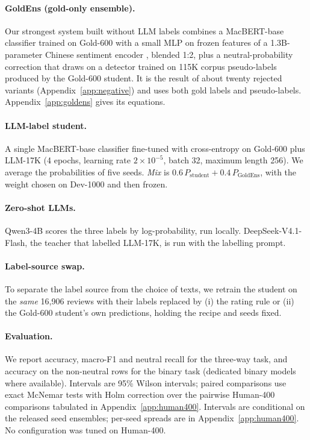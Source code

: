 \paragraph{GoldEns (gold-only ensemble).} Our strongest system built
without LLM labels combines a MacBERT-base classifier
\citep{cui2020macbert} trained on Gold-600 with a small MLP on frozen
features of a 1.3B-parameter Chinese sentiment encoder
\citep{fengshenbang2022}, blended 1:2, plus a neutral-probability
correction that draws on a detector trained on 115K corpus
pseudo-labels produced by the Gold-600 student. It is the result of
about twenty rejected variants (Appendix~\ref{app:negative}) and uses
both gold labels and pseudo-labels. Appendix~\ref{app:goldens} gives
its equations.

\paragraph{LLM-label student.} A single MacBERT-base classifier
fine-tuned with cross-entropy on Gold-600 plus LLM-17K (4 epochs,
learning rate $2{\times}10^{-5}$, batch 32, maximum length 256). We
average the probabilities of five seeds. \emph{Mix} is
$0.6\,P_{\text{student}} + 0.4\,P_{\text{GoldEns}}$, with the weight
chosen on Dev-1000 and then frozen.

\paragraph{Zero-shot LLMs.} Qwen3-4B \citep{qwen2025} scores the three
labels by log-probability, run locally.
\ifSone DeepSeek-V4.1-Flash, the teacher that labelled LLM-17K, is
run with the labelling prompt.\fi

\ifStwo
\paragraph{Label-source swap.} To separate the label source from the
choice of texts, we retrain the student on the \emph{same} 16{,}906
reviews with their labels replaced by (i) the rating rule or (ii) the
Gold-600 student's own predictions, holding the recipe and seeds
fixed.
\fi

\paragraph{Evaluation.} We report accuracy, macro-F1 and neutral
recall for the three-way task, and accuracy on the non-neutral rows
for the binary task (dedicated binary models where available).
Intervals are 95\% Wilson intervals; paired comparisons use exact
McNemar tests with Holm correction over the pairwise Human-400
comparisons tabulated in Appendix~\ref{app:human400}. Intervals are
conditional on the released seed ensembles; per-seed spreads are in
Appendix~\ref{app:human400}. No configuration was tuned on Human-400.

